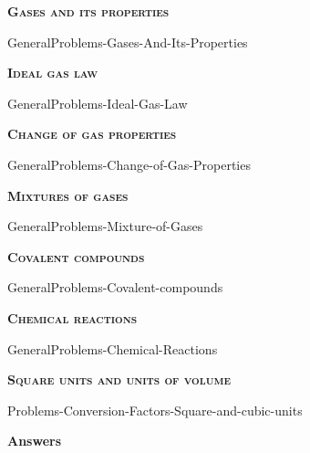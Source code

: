 \documentclass[main.tex]{subfiles}
\begin{document}
\newpage
\fancyhfoffset[E,O]{0pt}
\setlength{\columnsep}{30pt}
\begin{conclusion}
\end{conclusion}
\begin{multicols*}{2}\setcounter{numA}{1}  %













\newcommand\chapterlabel{Ch-Gas}
{\raggedright\textsc{\textbf{Gases and its properties}}\par}
 {GeneralProblems-Gases-And-Its-Properties}
 {\raggedright\textsc{\textbf{Ideal gas law}}\par}
 {GeneralProblems-Ideal-Gas-Law}
 {\raggedright\textsc{\textbf{Change of gas properties}}\par}
  {GeneralProblems-Change-of-Gas-Properties}
   {\raggedright\textsc{\textbf{Mixtures of gases}}\par}
 {GeneralProblems-Mixture-of-Gases}
 
 
 {\raggedright\textsc{\textbf{Covalent compounds}}\par}
  \renewcommand\chapterlabel{Ch-naming}
 {GeneralProblems-Covalent-compounds}


 
 
{\raggedright\textsc{\textbf{Chemical reactions}}\par}\renewcommand\chapterlabel{Ch-mole}
{GeneralProblems-Chemical-Reactions}
{\raggedright\textsc{\textbf{Square units and units of volume}}\par}\renewcommand\chapterlabel{Ch-measurements}
{Problems-Conversion-Factors-Square-and-cubic-units}

 
 

\end{multicols*}
\newpage
\begin{answersenvironment}
\begin{minipage}[c]{1\textwidth}
\begin{localsize}{10}
{\Large \bf Answers}
    \printsolutions[byID={1,3,5,7,9,11,13,15, 17,19,21,23,25, 27,29 }]  
\end{localsize}
\end{minipage}\end{answersenvironment}
\end{document}

